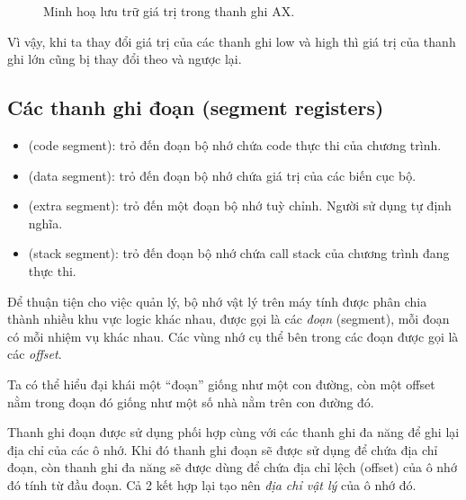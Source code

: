 \documentclass[main.tex]{subfiles}
\begin{document}
\begin{figure}[H]
    \centering
    \caption{Minh hoạ lưu trữ giá trị trong thanh ghi AX.}
\end{figure}

Vì vậy, khi ta thay đổi giá trị của các thanh ghi low và high thì giá trị của thanh ghi lớn cũng bị thay đổi theo và ngược lại.

\subsection{Các thanh ghi đoạn (segment registers)}
\begin{itemize}
    \item {} (code segment): trỏ đến đoạn bộ nhớ chứa code thực thi của chương trình.
    \item {} (data segment): trỏ đến đoạn bộ nhớ chứa giá trị của các biến cục bộ.
    \item {} (extra segment): trỏ đến một đoạn bộ nhớ tuỳ chỉnh. Người sử dụng tự định nghĩa.
    \item {} (stack segment): trỏ đến đoạn bộ nhớ chứa call stack của chương trình đang thực thi.
\end{itemize}

Để thuận tiện cho việc quản lý, bộ nhớ vật lý trên máy tính được phân chia thành nhiều khu vực logic khác nhau, được gọi là các \textit{đoạn} (segment), mỗi đoạn có mỗi nhiệm vụ khác nhau. Các vùng nhớ cụ thể bên trong các đoạn được gọi là các \textit{offset}.

Ta có thể hiểu đại khái một ``đoạn'' giống như một con đường, còn một offset nằm trong đoạn đó giống như một số nhà nằm trên con đường đó.

Thanh ghi đoạn được sử dụng phối hợp cùng với các thanh ghi đa năng để ghi lại địa chỉ của các ô nhớ. Khi đó thanh ghi đoạn sẽ được sử dụng để chứa địa chỉ đoạn, còn thanh ghi đa năng sẽ được dùng để chứa địa chỉ lệch (offset) của ô nhớ đó tính từ đầu đoạn. Cả 2 kết hợp lại tạo nên \textit{địa chỉ vật lý} của ô nhớ đó.
\end{document}
